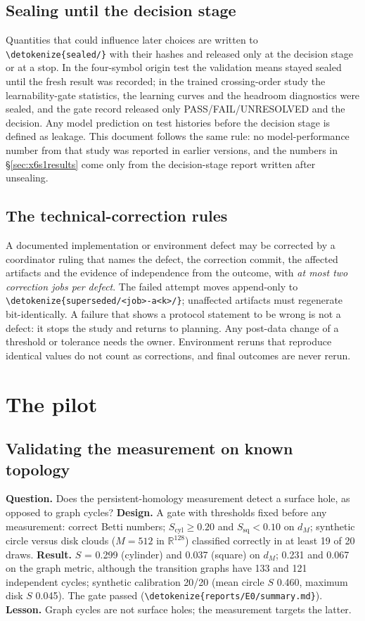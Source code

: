 \documentclass[11pt,a4paper]{article}
\DeclareRobustCommand{\_}{\ifmmode\origunderscore\else\textunderscore\allowbreak\fi}
\DeclareRobustCommand{\fpath}[1]{\begingroup\small\expandafter\nolinkurl\expandafter{\detokenize{#1}}\endgroup}
\begin{document}
\subsection{Sealing until the decision stage}
Quantities that could influence later choices are written to \fpath{sealed/} with their hashes
and released only at the decision stage or at a stop. In the four-symbol origin test the
validation means stayed sealed until the fresh result was recorded; in the trained crossing-order
study the learnability-gate statistics, the learning curves and the headroom diagnostics were
sealed, and the gate record released only PASS/FAIL/UNRESOLVED and the decision. Any model
prediction on test histories before the decision stage is defined as leakage. This document
follows the same rule: no model-performance number from that study was reported in earlier
versions, and the numbers in \S\ref{sec:x6s1results} come only from the decision-stage report
written after unsealing.

\subsection{The technical-correction rules}
A documented implementation or environment defect may be corrected by a coordinator ruling
that names the defect, the correction commit, the affected artifacts and the evidence of
independence from the outcome, with \emph{at most two correction jobs per defect}. The failed
attempt moves append-only to \fpath{superseded/<job>-a<k>/}; unaffected artifacts must regenerate
bit-identically. A failure that shows a protocol statement to be wrong is not a defect: it
stops the study and returns to planning. Any post-data change of a threshold or tolerance needs
the owner. Environment reruns that reproduce identical values do not count as corrections, and
final outcomes are never rerun.

\section{The pilot}\label{sec:pilot}

\subsection{Validating the measurement on known topology}
\textbf{Question.} Does the persistent-homology measurement detect a surface hole, as opposed to
graph cycles? \textbf{Design.} A gate with thresholds fixed before any measurement: correct Betti
numbers; $S_{\mathrm{cyl}}\ge0.20$ and $S_{\mathrm{sq}}<0.10$ on $d_M$; synthetic circle versus disk
clouds ($M=512$ in $\mathbb{R}^{128}$) classified correctly in at least 19 of 20 draws.
\textbf{Result.} $S$ = 0.299 (cylinder) and 0.037 (square) on $d_M$; 0.231 and 0.067 on the graph
metric, although the transition graphs have 133 and 121 independent cycles; synthetic calibration
20/20 (mean circle $S$ 0.460, maximum disk $S$ 0.045). The gate passed (\fpath{reports/E0/summary.md}).
\textbf{Lesson.} Graph cycles are not surface holes; the measurement targets the latter.
\end{document}
